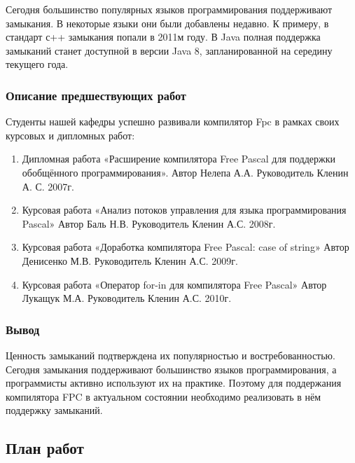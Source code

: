 \documentclass{imcs}
\begin{document}
Сегодня большинство популярных языков программирования поддерживают
замыкания. В некоторые языки они были добавлены недавно. К
примеру, в стандарт с++ замыкания попали в 2011м году. В Java
полная поддержка замыканий станет доступной в версии Java 8,
запланированной на середину текущего года.
\fi

\subsubsection{Описание предшествующих работ}
Студенты нашей кафедры успешно развивали компилятор Fpc в рамках своих
курсовых и дипломных работ:
\begin{enumerate}
    \item Дипломная работа «Расширение компилятора Free Pascal для поддержки обобщённого программирования». Автор Нелепа А.А. Руководитель Кленин А. С. 2007г.\cite{diplomnelepa}
    \item Курсовая работа «Анализ потоков управления для языка программирования Pascal» Автор Баль Н.В. Руководитель Кленин А.С. 2008г.\cite{coursebal}
    \item Курсовая работа «Доработка компилятора Free Pascal: case of string» Автор Денисенко М.В. Руководитель Кленин А.С. 2009г.\cite{misha}
    \item Курсовая работа «Оператор for-in для компилятора Free Pascal» Автор Лукащук М.А. Руководитель Кленин А.С. 2010г.\cite{courseluck}
\end{enumerate}

\subsubsection{Вывод}

Ценность замыканий подтверждена их популярностью и востребованностью. 
Сегодня замыкания поддерживают большинство языков программирования, а программисты 
активно используют их на практике. Поэтому для поддержания компилятора FPC в 
актуальном состоянии необходимо реализовать в нём поддержку замыканий.

\subsection{План работ}
\end{document}
